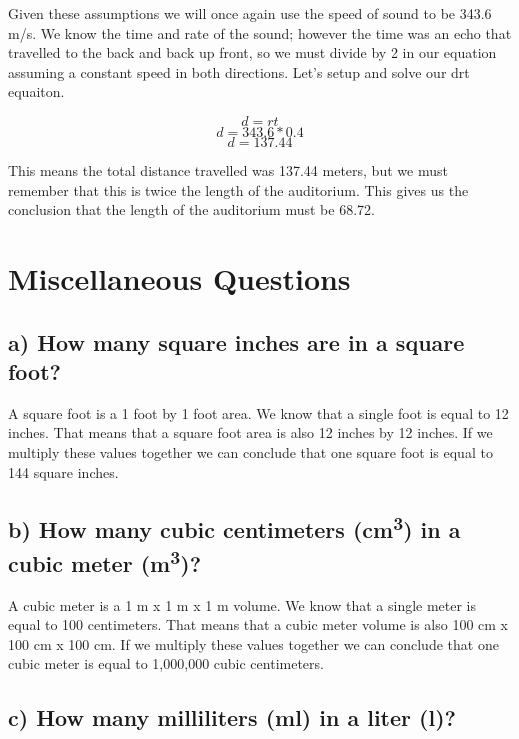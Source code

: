 \documentclass[]{article}
\begin{document}
Given these assumptions we will once again use the speed of sound to be
343.6 m/s. We know the time and rate of the sound; however the time was
an echo that travelled to the back and back up front, so we must divide
by 2 in our equation assuming a constant speed in both directions. Let's
setup and solve our drt equaiton.

\[d = rt\] \[d = 343.6 * 0.4\] \[d = 137.44\]

This means the total distance travelled was 137.44 meters, but we must
remember that this is twice the length of the auditorium. This gives us
the conclusion that the length of the auditorium must be 68.72.

\section{Miscellaneous Questions}\label{miscellaneous-questions}

\subsection{a) How many square inches are in a square
foot?}\label{a-how-many-square-inches-are-in-a-square-foot}

A square foot is a 1 foot by 1 foot area. We know that a single foot is
equal to 12 inches. That means that a square foot area is also 12 inches
by 12 inches. If we multiply these values together we can conclude that
one square foot is equal to 144 square inches.

\subsection{\texorpdfstring{b) How many cubic centimeters
(cm\textsuperscript{3}) in a cubic meter
(m\textsuperscript{3})?}{b) How many cubic centimeters (cm3) in a cubic meter (m3)?}}\label{b-how-many-cubic-centimeters-cm3-in-a-cubic-meter-m3}

A cubic meter is a 1 m x 1 m x 1 m volume. We know that a single meter
is equal to 100 centimeters. That means that a cubic meter volume is
also 100 cm x 100 cm x 100 cm. If we multiply these values together we
can conclude that one cubic meter is equal to 1,000,000 cubic
centimeters.

\subsection{c) How many milliliters (ml) in a liter
(l)?}\label{c-how-many-milliliters-ml-in-a-liter-l}
\end{document}
